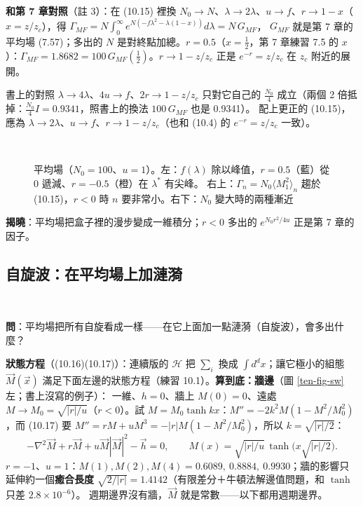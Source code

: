 \textbf{和第 7 章對照}（註 3）：在 (10.15) 裡換 $N_0\to N$、$\lambda\to2\lambda$、$u\to f$、$r\to1-x$（$x=z/z_c$），得 $\Gamma_{MF}=N\int_0^\infty e^{N(-f\lambda^2-\lambda(1-x))}d\lambda=N\,G_{MF}$，
$G_{MF}$ 就是第 7 章的平均場 (7.57)；多出的 $N$ 是對終點加總。$r=0.5$（$x=\frac12$，第 7 章練習 7.5 的 $x$）：$\Gamma_{MF}=1.8682=100\,G_{MF}(\frac12)$。$r\to1-z/z_c$ 正是 $e^{-r}=z/z_c$ 在 $z_c$ 附近的展開。
\begin{errbox}[p.~238，註 3]
書上的對照 $\lambda\to4\lambda$、$4u\to f$、$2r\to1-z/z_c$ 只對它自己的 $\frac{N_0}4$ 成立（兩個 2 倍抵掉：$\frac{N_0}4I=0.9341$，照書上的換法 $100\,G_{MF}$ 也是 0.9341）。
配上更正的 (10.15)，應為 $\lambda\to2\lambda$、$u\to f$、$r\to1-z/z_c$（也和 (10.4) 的 $e^{-r}=z/z_c$ 一致）。
\end{errbox}

\begin{figure}[htbp]
\centering
\begin{minipage}[c]{0.42\linewidth}\centering\TenFigMF\end{minipage}\hfill
\begin{minipage}[c]{0.56\linewidth}\centering\footnotesize\setlength{\tabcolsep}{3pt}\TenTabN\\[8pt]\TenTabAsym\end{minipage}
\caption{平均場（$N_0=100$、$u=1$）。左：$f(\lambda)$ 除以峰值，$r=0.5$（藍）從 0 遞減、$r=-0.5$（橙）在 $\lambda^*$ 有尖峰。
右上：$\Gamma_n=N_0\langle M_1^2\rangle_n$ 趨於 (10.15)，$r<0$ 時 $n$ 要非常小。右下：$N_0$ 變大時的兩種漸近}\label{ten-fig-mf}
\end{figure}

\textbf{揭曉}：平均場把盒子裡的漫步變成一維積分；$r<0$ 多出的 $e^{N_0r^2/4u}$ 正是第 7 章的因子。

\subsection{自旋波：在平均場上加漣漪}
\leavevmode{}\ \par\nopagebreak

\textbf{問}：平均場把所有自旋看成一樣——在它上面加一點漣漪（自旋波），會多出什麼？

\textbf{狀態方程}（(10.16)(10.17)）：連續版的 $\mathcal H$ 把 $\sum_i$ 換成 $\int d^dx$；讓它極小的組態 $\vec M(\vec x)$ 滿足下面左邊的狀態方程（練習 10.1）。\textbf{算到底：牆邊}（圖 \ref{ten-fig-sw} 左；書上沒寫的例子）：
一維、$h=0$、牆上 $M(0)=0$、遠處 $M\to M_0=\sqrt{|r|/u}$（$r<0$）。試 $M=M_0\tanh kx$：$M''=-2k^2M(1-M^2/M_0^2)$，而 (10.17) 要 $M''=rM+uM^3=-|r|M(1-M^2/M_0^2)$，所以 $k=\sqrt{|r|/2}$：
\[-\nabla^2\vec M+r\vec M+u\vec M|\vec M|^2-\vec h=0,\qquad M(x)=\sqrt{|r|/u}\,\tanh\big(x\sqrt{|r|/2}\big).\tag{10.17}\]
$r=-1$、$u=1$：$M(1),M(2),M(4)=0.6089,\allowbreak\ 0.8884,\allowbreak\ 0.9930$；牆的影響只延伸約一個\textbf{癒合長度} $\sqrt{2/|r|}=1.4142$（有限差分＋牛頓法解邊值問題，和 $\tanh$ 只差 $2.8\times10^{-6}$）。
週期邊界沒有牆，$\vec M$ 就是常數——以下都用週期邊界。

